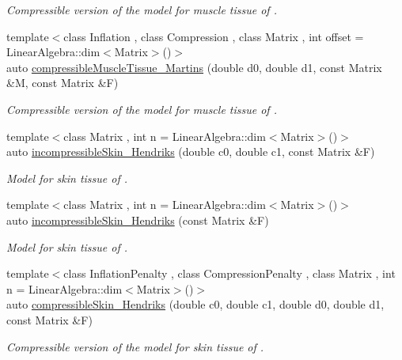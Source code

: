 \begin{DoxyCompactItemize}
\begin{DoxyCompactList}\small\item\em Compressible version of the model for muscle tissue of \cite{Martins1998}. \end{DoxyCompactList}\item 
{\footnotesize template$<$class Inflation , class Compression , class Matrix , int offset = Linear\-Algebra\-::dim$<$\-Matrix$>$()$>$ }\\auto \hyperlink{group__Biomechanics_ga46a70ccb2285e12addad87b6a8aaaae8}{compressible\-Muscle\-Tissue\-\_\-\-Martins} (double d0, double d1, const Matrix \&M, const Matrix \&F)
\begin{DoxyCompactList}\small\item\em Compressible version of the model for muscle tissue of \cite{Martins1998}. \end{DoxyCompactList}\item 
{\footnotesize template$<$class Matrix , int n = Linear\-Algebra\-::dim$<$\-Matrix$>$()$>$ }\\auto \hyperlink{group__Biomechanics_gaa20bf15ef6976d64d89490429035b2c4}{incompressible\-Skin\-\_\-\-Hendriks} (double c0, double c1, const Matrix \&F)
\begin{DoxyCompactList}\small\item\em Model for skin tissue of \cite{Hendriks2005}. \end{DoxyCompactList}\item 
{\footnotesize template$<$class Matrix , int n = Linear\-Algebra\-::dim$<$\-Matrix$>$()$>$ }\\auto \hyperlink{group__Biomechanics_gad8653218bd2afb4e3cfd601a5142956c}{incompressible\-Skin\-\_\-\-Hendriks} (const Matrix \&F)
\begin{DoxyCompactList}\small\item\em Model for skin tissue of \cite{Hendriks2005}. \end{DoxyCompactList}\item 
{\footnotesize template$<$class Inflation\-Penalty , class Compression\-Penalty , class Matrix , int n = Linear\-Algebra\-::dim$<$\-Matrix$>$()$>$ }\\auto \hyperlink{group__Biomechanics_ga07b4c52c6ecf7e72f73ab5832fb262cd}{compressible\-Skin\-\_\-\-Hendriks} (double c0, double c1, double d0, double d1, const Matrix \&F)
\begin{DoxyCompactList}\small\item\em Compressible version of the model for skin tissue of \cite{Hendriks2005}. \end{DoxyCompactList}\item 

\end{DoxyCompactItemize}
